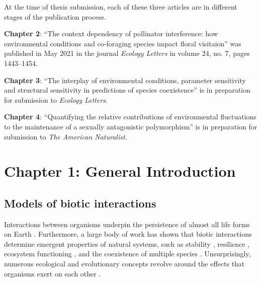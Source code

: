 \documentclass[12pt]{article}
\begin{document}
At the time of thesis submission, each of these three articles are in different stages of the publication process.

\textbf{Chapter 2}: ``The context dependency of pollinator interference: how environmental conditions and co-foraging species impact floral visitaion'' was published in May 2021 in the journal \textit{Ecology Letters} in volume 24, no. 7, pages 1443--1454.

\textbf{Chapter 3}: ``The interplay of environmental conditions, parameter sensitivity and structural sensitivity in predictions of species coexistence'' is in preparation for submission to \textit{Ecology Letters}.

\textbf{Chapter 4}: ``Quantifying the relative contributions of environmental fluctuations to the maintenance of a sexually antagonistic polymorphism'' is in preparation for submission to \textit{The American Naturalist}.

\clearpage
\section*{Chapter 1: General Introduction}

\subsection*{Models of biotic interactions}
Interactions between organisms underpin the persistence of almost all life forms on Earth \citep{lawton1999there}. Furthermore, a large body of work has shown that biotic interactions determine emergent properties of natural systems, such as stability \citep{may1972will, wootton2016many,song2018will}, resilience \citep{capdevila2021reconciling}, ecosystem functioning \citep{turnbull2013coexistence,godoy2020excess}, and the coexistence of multiple species \citep{chesson2000mechanisms,saavedra2017structural}. Unsurprisingly, numerous ecological and evolutionary concepts revolve around the effects that organisms exert on each other \citep{gause_experimental_1934,macarthur1967limiting,thompson1999evolution, hillerislambers2012rethinking, chase2009ecological,thompson2014interaction}.
\end{document}
